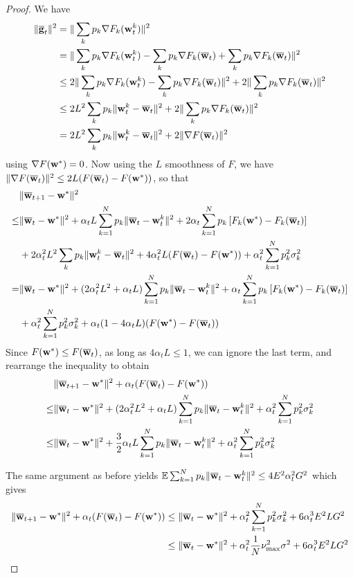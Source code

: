 \begin{proof}
	We have
	\begin{align*}
	\|{\overline{\mathbf{g}}}_{t}\|^{2} & =\|\sum_{k}p_{k}\nabla F_{k}({\mathbf{w}}_{t}^{k})\|^{2}\\
	& =\|\sum_{k}p_{k}\nabla F_{k}({\mathbf{w}}_{t}^{k})-\sum_{k}p_{k}\nabla F_{k}({\overline{\mathbf{w}}}_{t})+\sum_{k}p_{k}\nabla F_{k}({\overline{\mathbf{w}}}_{t})\|^{2}\\
	& \leq2\|\sum_{k}p_{k}\nabla F_{k}({\mathbf{w}}_{t}^{k})-\sum_{k}p_{k}\nabla F_{k}({\overline{\mathbf{w}}}_{t})\|^{2}+2\|\sum_{k}p_{k}\nabla F_{k}({\overline{\mathbf{w}}}_{t})\|^{2}\\
	& \leq2L^{2}\sum_{k}p_{k}\|{\mathbf{w}}_{t}^{k}-{\overline{\mathbf{w}}}_{t}\|^{2}+2\|\sum_{k}p_{k}\nabla F_{k}({\overline{\mathbf{w}}}_{t})\|^{2}\\
	& =2L^{2}\sum_{k}p_{k}\|{\mathbf{w}}_{t}^{k}-{\overline{\mathbf{w}}}_{t}\|^{2}+2\|\nabla F({\overline{\mathbf{w}}}_{t})\|^{2}
	\end{align*}
	using $\nabla F({\mathbf{w}}^{\ast})=0$. Now using the $L$ smoothness of $F$,
	we have $\|\nabla F({\overline{\mathbf{w}}}_{t})\|^{2}\leq2L(F({\overline{\mathbf{w}}}_{t})-F({\mathbf{w}}^{\ast}))$,
	so that 
	\begin{align*}
	& \|{\overline{\mathbf{w}}}_{t+1}-{\mathbf{w}}^{\ast}\|^{2}\\
	\leq & \|{\overline{\mathbf{w}}}_{t}-{\mathbf{w}}^{\ast}\|^{2}+\alpha_{t}L\sum_{k=1}^{N}p_{k}\|{\overline{\mathbf{w}}}_{t}-{\mathbf{w}}_{t}^{k}\|^{2}+2\alpha_{t}\sum_{k=1}^{N}p_{k}\left[F_{k}({\mathbf{w}}^{\ast})-F_{k}({\overline{\mathbf{w}}}_{t})\right]\\
	& +2\alpha_{t}^{2}L^{2}\sum_{k}p_{k}\|{\mathbf{w}}_{t}^{k}-{\overline{\mathbf{w}}}_{t}\|^{2}+4\alpha_{t}^{2}L(F({\overline{\mathbf{w}}}_{t})-F({\mathbf{w}}^{\ast}))+\alpha_{t}^{2}\sum_{k=1}^{N}p_{k}^{2}\sigma_{k}^{2}\\
	= & \|{\overline{\mathbf{w}}}_{t}-{\mathbf{w}}^{\ast}\|^{2}+(2\alpha_{t}^{2}L^{2}+\alpha_{t}L)\sum_{k=1}^{N}p_{k}\|{\overline{\mathbf{w}}}_{t}-{\mathbf{w}}_{t}^{k}\|^{2}+\alpha_{t}\sum_{k=1}^{N}p_{k}\left[F_{k}({\mathbf{w}}^{\ast})-F_{k}({\overline{\mathbf{w}}}_{t})\right] \\ 
	 & +\alpha_{t}^{2}\sum_{k=1}^{N}p_{k}^{2}\sigma_{k}^{2}
	 +\alpha_{t}(1-4\alpha_{t}L)(F({\mathbf{w}}^{\ast})-F({\overline{\mathbf{w}}}_{t}))
	\end{align*}
	Since $F({\mathbf{w}}^{\ast})\leq F({\overline{\mathbf{w}}}_{t})$, as long as $4\alpha_{t}L\leq1$,
	we can ignore the last term, and rearrange the inequality to obtain
	\begin{align*}
	& \|{\overline{\mathbf{w}}}_{t+1}-{\mathbf{w}}^{\ast}\|^{2}+\alpha_{t}(F({\overline{\mathbf{w}}}_{t})-F({\mathbf{w}}^{\ast}))\\
 \leq & \|{\overline{\mathbf{w}}}_{t}-{\mathbf{w}}^{\ast}\|^{2}+(2\alpha_{t}^{2}L^{2}+\alpha_{t}L)\sum_{k=1}^{N}p_{k}\|{\overline{\mathbf{w}}}_{t}-{\mathbf{w}}_{t}^{k}\|^{2}+\alpha_{t}^{2}\sum_{k=1}^{N}p_{k}^{2}\sigma_{k}^{2}\\
	\leq & \|{\overline{\mathbf{w}}}_{t}-{\mathbf{w}}^{\ast}\|^{2}+\frac{3}{2}\alpha_{t}L\sum_{k=1}^{N}p_{k}\|{\overline{\mathbf{w}}}_{t}-{\mathbf{w}}_{t}^{k}\|^{2}+\alpha_{t}^{2}\sum_{k=1}^{N}p_{k}^{2}\sigma_{k}^{2}
	\end{align*}
	
	The same argument as before yields $\mathbb{E}\sum_{k=1}^{N}p_{k}\|{\overline{\mathbf{w}}}_{t}-{\mathbf{w}}_{t}^{k}\|^{2}\leq4E^{2}\alpha_{t}^{2}G^{2}$
	which gives 
	\begin{align*}
	\|{\overline{\mathbf{w}}}_{t+1}-{\mathbf{w}}^{\ast}\|^{2}+\alpha_{t}(F({\overline{\mathbf{w}}}_{t})-F({\mathbf{w}}^{\ast})) & \leq\|{\overline{\mathbf{w}}}_{t}-{\mathbf{w}}^{\ast}\|^{2}+\alpha_{t}^{2}\sum_{k=1}^{N}p_{k}^{2}\sigma_{k}^{2}+6\alpha_{t}^{3}E^{2}LG^{2}\\
	& \leq\|{\overline{\mathbf{w}}}_{t}-{\mathbf{w}}^{\ast}\|^{2}+\alpha_{t}^{2}\frac{1}{N}\nu_{\max}^{2}\sigma^{2}+6\alpha_{t}^{3}E^{2}LG^{2}
	\end{align*}
\end{proof}
